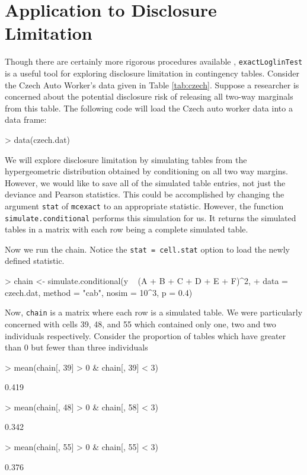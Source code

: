 \documentclass[a4paper]{article}
\newcommand{\mcexact}{\texttt{mcexact} }
\begin{document}
\section{Application to Disclosure Limitation}
Though there are certainly more rigorous procedures available
\citep[see][]{dobra}, \texttt{exactLoglinTest} is a useful tool for exploring
disclosure limitation in contingency tables.  Consider the Czech Auto
Worker's data given in Table \ref{tab:czech}. Suppose a researcher is
concerned about the potential disclosure risk of releasing all two-way
marginals from this table. The following code will load the Czech auto
worker data into a data frame:
\begin{Schunk}
\begin{Sinput}
> data(czech.dat)
\end{Sinput}
\end{Schunk}

We will explore disclosure limitation by simulating tables from the
hypergeometric distribution obtained by conditioning on all two way
margins. However, we would like to save all of the simulated table
entries, not just the deviance and Pearson statistics. This could be
accomplished by changing the argument \texttt{stat} of \mcexact to an
appropriate statistic. However, the function
\texttt{simulate.conditional} performs this simulation for us. It
returns the simulated tables in a matrix with each row being a
complete simulated table.

Now we run the chain. Notice the \texttt{stat = cell.stat} option to
load the newly defined statistic.
\begin{Schunk}
\begin{Sinput}
> chain <- simulate.conditional(y ~ (A + B + C + D + E + F)^2, 
+     data = czech.dat, method = "cab", nosim = 10^3, p = 0.4)
\end{Sinput}
\end{Schunk}

Now, \texttt{chain} is a matrix where each row is a simulated table.
We were particularly concerned with cells 39, 48, and 55 which
contained only one, two and two individuals respectively. Consider the
proportion of tables which have greater than 0 but fewer than three
individuals
\begin{Schunk}
\begin{Sinput}
> mean(chain[, 39] > 0 & chain[, 39] < 3)
\end{Sinput}
\begin{Soutput}
[1] 0.419
\end{Soutput}
\begin{Sinput}
> mean(chain[, 48] > 0 & chain[, 58] < 3)
\end{Sinput}
\begin{Soutput}
[1] 0.342
\end{Soutput}
\begin{Sinput}
> mean(chain[, 55] > 0 & chain[, 55] < 3)
\end{Sinput}
\begin{Soutput}
[1] 0.376
\end{Soutput}
\end{Schunk}
\end{document}
